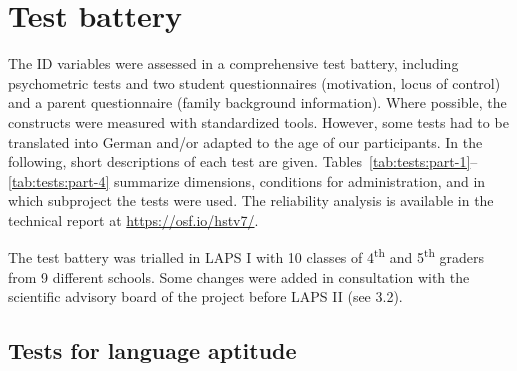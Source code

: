 \documentclass[output=paper]{langsci/langscibook}
\begin{document}
\section{Test battery}\label{sec:02:3}

The ID variables were assessed in a comprehensive test battery, including psychometric tests and two student questionnaires (motivation, locus of control) and a parent questionnaire (family background information). Where possible, the constructs were measured with standardized tools. However, some tests had to be translated into German and/or adapted to the age of our participants. In the following, short descriptions of each test are given. Tables~\ref{tab:tests:part-1}--\ref{tab:tests:part-4} summarize dimensions, conditions for administration, and in which subproject the tests were used. The reliability analysis is available in the technical report at \url{https://osf.io/hstv7/}.

The test battery was trialled in LAPS I with 10 classes of 4\textsuperscript{th} and 5\textsuperscript{th} graders from 9 different schools. Some changes were added in consultation with the scientific advisory board of the project before LAPS II (see 3.2).

\subsection{Tests for language aptitude}
\end{document}
